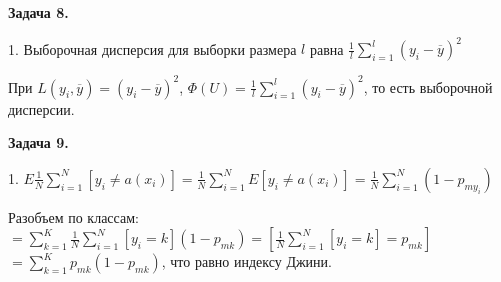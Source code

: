 \documentclass{article}
\begin{document}
    \textbf {Задача 8.}

    1. Выборочная дисперсия для выборки размера $l$ равна $\frac{1}{l}\sum_{i=1}^l (y_i-\overline{y})^2$

    При $L(y_i, \overline{y})=(y_i-\overline{y})^2$, $\Phi(U)=\frac{1}{l}\sum_{i=1}^l (y_i-\overline{y})^2$,
    то есть выборочной дисперсии.

    \textbf {Задача 9.}

    1. $E\frac{1}{N}\sum_{i=1}^N [y_i \neq a(x_i)]=\frac{1}{N}\sum_{i=1}^N E[y_i \neq a(x_i)]=\frac{1}{N}\sum_{i=1}^N (1-p_{my_i})$

    Разобъем по классам:
    $=\sum_{k=1}^K \frac{1}{N}\sum_{i=1}^N [y_i=k](1-p_{mk})=[\frac{1}{N}\sum_{i=1}^N [y_i=k]=p_{mk}]$
    $=\sum_{k=1}^K p_{mk}(1-p_{mk})$, что равно индексу Джини.
\end{document}

